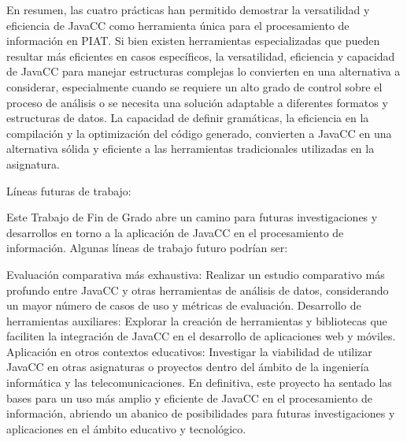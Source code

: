 En resumen, las cuatro prácticas han permitido demostrar la versatilidad y eficiencia de JavaCC como herramienta única para el procesamiento de información en PIAT. Si bien existen herramientas especializadas que pueden resultar más eficientes en casos específicos, la versatilidad, eficiencia y capacidad de JavaCC para manejar estructuras complejas lo convierten en una alternativa a considerar, especialmente cuando se requiere un alto grado de control sobre el proceso de análisis o se necesita una solución adaptable a diferentes formatos y estructuras de datos. La capacidad de definir gramáticas, la eficiencia en la compilación y la optimización del código generado, convierten a JavaCC en una alternativa sólida y eficiente a las herramientas tradicionales utilizadas en la asignatura.

Líneas futuras de trabajo:

Este Trabajo de Fin de Grado abre un camino para futuras investigaciones y desarrollos en torno a la aplicación de JavaCC en el procesamiento de información. Algunas líneas de trabajo futuro podrían ser:

Evaluación comparativa más exhaustiva: Realizar un estudio comparativo más profundo entre JavaCC y otras herramientas de análisis de datos, considerando un mayor número de casos de uso y métricas de evaluación.
Desarrollo de herramientas auxiliares: Explorar la creación de herramientas y bibliotecas que faciliten la integración de JavaCC en el desarrollo de aplicaciones web y móviles.
Aplicación en otros contextos educativos: Investigar la viabilidad de utilizar JavaCC en otras asignaturas o proyectos dentro del ámbito de la ingeniería informática y las telecomunicaciones.
En definitiva, este proyecto ha sentado las bases para un uso más amplio y eficiente de JavaCC en el procesamiento de información, abriendo un abanico de posibilidades para futuras investigaciones y aplicaciones en el ámbito educativo y tecnológico.